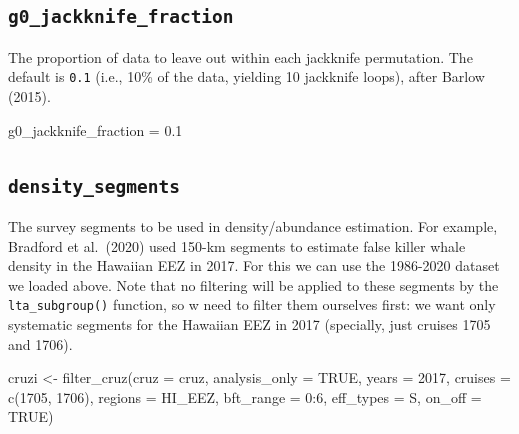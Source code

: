 \documentclass[
]{book}
\newenvironment{Shaded}{\begin{snugshade}}{\end{snugshade}}
\newcommand{\AttributeTok}[1]{\textcolor[rgb]{0.77,0.63,0.00}{#1}}
\newcommand{\ConstantTok}[1]{\textcolor[rgb]{0.00,0.00,0.00}{#1}}
\newcommand{\DecValTok}[1]{\textcolor[rgb]{0.00,0.00,0.81}{#1}}
\newcommand{\FloatTok}[1]{\textcolor[rgb]{0.00,0.00,0.81}{#1}}
\newcommand{\FunctionTok}[1]{\textcolor[rgb]{0.00,0.00,0.00}{#1}}
\newcommand{\NormalTok}[1]{#1}
\newcommand{\OtherTok}[1]{\textcolor[rgb]{0.56,0.35,0.01}{#1}}
\newcommand{\SpecialCharTok}[1]{\textcolor[rgb]{0.00,0.00,0.00}{#1}}
\newcommand{\StringTok}[1]{\textcolor[rgb]{0.31,0.60,0.02}{#1}}
\begin{document}
\hypertarget{g0_jackknife_fraction}{%
\subsection*{\texorpdfstring{\texttt{g0\_jackknife\_fraction}}{g0\_jackknife\_fraction}}\label{g0_jackknife_fraction}}

The proportion of data to leave out within each jackknife permutation. The default is \texttt{0.1} (i.e., 10\% of the data, yielding 10 jackknife loops), after Barlow (2015).

\begin{Shaded}
\begin{Highlighting}[]
\NormalTok{g0\_jackknife\_fraction }\OtherTok{=} \FloatTok{0.1}
\end{Highlighting}
\end{Shaded}

\hypertarget{density_segments}{%
\subsection*{\texorpdfstring{\texttt{density\_segments}}{density\_segments}}\label{density_segments}}

The survey segments to be used in density/abundance estimation. For example, Bradford et al.~(2020) used 150-km segments to estimate false killer whale density in the Hawaiian EEZ in 2017. For this we can use the 1986-2020 dataset we loaded above. Note that no filtering will be applied to these segments by the \texttt{lta\_subgroup()} function, so w need to filter them ourselves first: we want only systematic segments for the Hawaiian EEZ in 2017 (specially, just cruises 1705 and 1706).

\begin{Shaded}
\begin{Highlighting}[]
\NormalTok{cruzi }\OtherTok{\textless{}{-}} \FunctionTok{filter\_cruz}\NormalTok{(}\AttributeTok{cruz =}\NormalTok{ cruz,}
                      \AttributeTok{analysis\_only =} \ConstantTok{TRUE}\NormalTok{,}
                      \AttributeTok{years =} \DecValTok{2017}\NormalTok{,}
                      \AttributeTok{cruises =} \FunctionTok{c}\NormalTok{(}\DecValTok{1705}\NormalTok{, }\DecValTok{1706}\NormalTok{),}
                      \AttributeTok{regions =} \StringTok{\textquotesingle{}HI\_EEZ\textquotesingle{}}\NormalTok{,}
                      \AttributeTok{bft\_range =} \DecValTok{0}\SpecialCharTok{:}\DecValTok{6}\NormalTok{,}
                      \AttributeTok{eff\_types =} \StringTok{\textquotesingle{}S\textquotesingle{}}\NormalTok{,}
                      \AttributeTok{on\_off =} \ConstantTok{TRUE}\NormalTok{)}
\end{Highlighting}
\end{Shaded}
\end{document}
